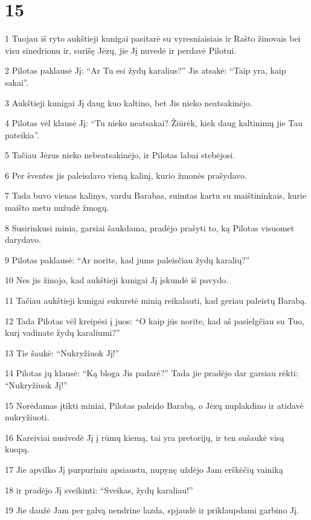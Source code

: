 \chapter{15}


\par 1 Tuojau iš ryto aukštieji kunigai pasitarė su vyresniaisiais ir Rašto žinovais bei visu sinedrionu ir, surišę Jėzų, jie Jį nuvedė ir perdavė Pilotui. 
\par 2 Pilotas paklausė Jį: “Ar Tu esi žydų karalius?” Jis atsakė: “Taip yra, kaip sakai”. 
\par 3 Aukštieji kunigai Jį daug kuo kaltino, bet Jis nieko neatsakinėjo. 
\par 4 Pilotas vėl klausė Jį: “Tu nieko neatsakai? Žiūrėk, kiek daug kaltinimų jie Tau pateikia”. 
\par 5 Tačiau Jėzus nieko nebeatsakinėjo, ir Pilotas labai stebėjosi. 
\par 6 Per šventes jis paleisdavo vieną kalinį, kurio žmonės prašydavo. 
\par 7 Tada buvo vienas kalinys, vardu Barabas, suimtas kartu su maištininkais, kurie maišto metu nužudė žmogų. 
\par 8 Susirinkusi minia, garsiai šaukdama, pradėjo prašyti to, ką Pilotas visuomet darydavo. 
\par 9 Pilotas paklausė: “Ar norite, kad jums paleisčiau žydų karalių?” 
\par 10 Nes jis žinojo, kad aukštieji kunigai Jį įskundė iš pavydo. 
\par 11 Tačiau aukštieji kunigai sukurstė minią reikalauti, kad geriau paleistų Barabą. 
\par 12 Tada Pilotas vėl kreipėsi į juos: “O kaip jūs norite, kad aš pasielgčiau su Tuo, kurį vadinate žydų karaliumi?” 
\par 13 Tie šaukė: “Nukryžiuok Jį!” 
\par 14 Pilotas jų klausė: “Ką bloga Jis padarė?” Tada jie pradėjo dar garsiau rėkti: “Nukryžiuok Jį!” 
\par 15 Norėdamas įtikti miniai, Pilotas paleido Barabą, o Jėzų nuplakdino ir atidavė nukryžiuoti. 
\par 16 Kareiviai nusivedė Jį į rūmų kiemą, tai yra pretorijų, ir ten sušaukė visą kuopą. 
\par 17 Jie apvilko Jį purpuriniu apsiaustu, nupynę uždėjo Jam erškėčių vainiką 
\par 18 ir pradėjo Jį sveikinti: “Sveikas, žydų karaliau!” 
\par 19 Jie daužė Jam per galvą nendrine lazda, spjaudė ir priklaupdami garbino Jį. 
